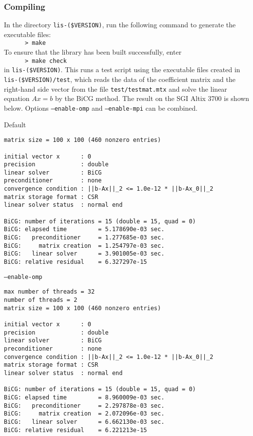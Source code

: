 \documentclass[a4paper]{article}
\begin{document}
\subsubsection{Compiling}
In the directory {\tt lis-(\$VERSION)}, run the following command to generate
the executable files: \\
 \verb+      > make +\\
To ensure that the library has been built successfully, enter 
\\
 \verb+      > make check+\\
in {\tt lis-(\$VERSION)}. 
This runs a test script using the executable files created 
in {\tt lis-(\$VERSION)/test}, which reads 
the data of the coefficient matrix and the right-hand side vector 
from the file 
{\tt test/testmat.mtx} and solve the linear equation $Ax = b$ 
by the BiCG method. The result on the SGI Altix 3700 is
 shown below. Options {\tt --enable-omp} and {\tt --enable-mpi} can be combined.
\begin{itemsquarebox}[l]{Default}
 \begin{minipage}{10cm}
 \begin{verbatim}
matrix size = 100 x 100 (460 nonzero entries)

initial vector x      : 0
precision             : double
linear solver         : BiCG
preconditioner        : none
convergence condition : ||b-Ax||_2 <= 1.0e-12 * ||b-Ax_0||_2
matrix storage format : CSR
linear solver status  : normal end

BiCG: number of iterations = 15 (double = 15, quad = 0)
BiCG: elapsed time         = 5.178690e-03 sec.
BiCG:   preconditioner     = 1.277685e-03 sec. 
BiCG:     matrix creation  = 1.254797e-03 sec.
BiCG:   linear solver      = 3.901005e-03 sec.
BiCG: relative residual    = 6.327297e-15
 \end{verbatim}
 \end{minipage}
\end{itemsquarebox}
\begin{itemsquarebox}[l]{{\tt --enable-omp}}
 \begin{minipage}{10cm}
 \begin{verbatim}
max number of threads = 32
number of threads = 2
matrix size = 100 x 100 (460 nonzero entries)

initial vector x      : 0
precision             : double
linear solver         : BiCG
preconditioner        : none
convergence condition : ||b-Ax||_2 <= 1.0e-12 * ||b-Ax_0||_2
matrix storage format : CSR
linear solver status  : normal end

BiCG: number of iterations = 15 (double = 15, quad = 0)
BiCG: elapsed time         = 8.960009e-03 sec.
BiCG:   preconditioner     = 2.297878e-03 sec. 
BiCG:     matrix creation  = 2.072096e-03 sec.
BiCG:   linear solver      = 6.662130e-03 sec.
BiCG: relative residual    = 6.221213e-15
 \end{verbatim}
 \end{minipage}
\end{itemsquarebox}
\end{document}
